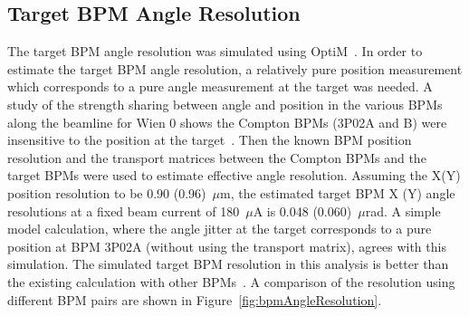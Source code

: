\subsection{Target BPM Angle Resolution}
\label{Target BPM Angle Resolution}

The target BPM angle resolution was simulated using OptiM~\cite{OPTIM}. 
In order to estimate the target BPM angle resolution, a relatively pure position measurement which corresponds to a pure angle measurement at the target was needed. 
A study of the strength sharing between angle and position in the various BPMs along the beamline for Wien 0 shows the Compton BPMs (3P02A and B) were insensitive to the position at the target~\cite{presentation:nur_BPMAngleResolution_1779}. Then the known BPM position resolution and the transport matrices between the Compton BPMs and the target BPMs were used to estimate effective angle resolution. 
Assuming the X(Y) position resolution to be 0.90 (0.96)~$\mu$m, the estimated target BPM X (Y) angle resolutions at a fixed beam current of 180~$\mu$A is 0.048 (0.060)~$\mu$rad.
%
%
%
A simple model calculation, where the angle jitter at the target corresponds to a pure position at BPM 3P02A (without using the transport matrix), agrees with this simulation. 
The simulated target BPM resolution in this analysis is better than the existing calculation with other BPMs~\cite{presentation:mack_Wien0MDSensitivities_1776}. A comparison of the resolution using different BPM pairs are shown in Figure~\ref{fig:bpmAngleResolution}.

